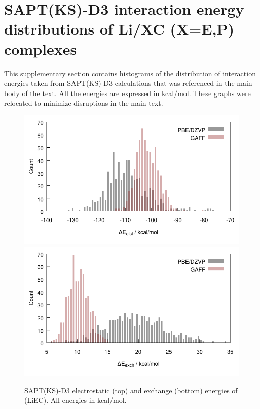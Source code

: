 \chapter{SAPT(KS)-D3 interaction energy distributions of Li\sur{+}/XC (X=E,P) complexes~}
\label{chap:a4}


This supplementary section contains histograms of the distribution of interaction energies taken from SAPT(KS)-D3 calculations that was referenced in the main 
body of the text. All the energies are expressed in kcal/mol. These graphs were relocated to minimize disruptions in the main text.

\begin{figure}
 \begin{center}
 \includegraphics[width=0.9\linewidth]{images/ecpc/liec_elst.pdf} \\
 \includegraphics[width=0.9\linewidth]{images/ecpc/liec_exch.pdf}
 \end{center} 
 \caption[SAPT(KS)-D3 electrostatic and exchange energies of (LiEC)\sur{+}]{\label{fig:ecsapt1}SAPT(KS)-D3 electrostatic (top) and exchange (bottom)
 energies of (LiEC)\sur{+}. All energies in kcal/mol.}
\end{figure}

